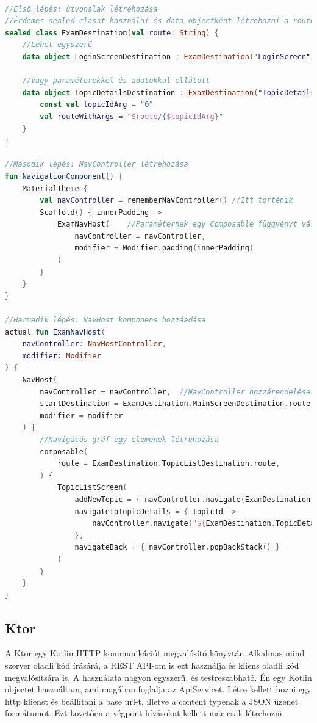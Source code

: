 \begin{lstlisting}[caption={Példa a Navigation használatára.}, label={lst:nav}, language=Kotlin]

//Első lépés: útvonalak létrehozása
//Érdemes sealed classt használni és data objectként létrehozni a routeokat
sealed class ExamDestination(val route: String) {
    //Lehet egyszerű
    data object LoginScreenDestination : ExamDestination("LoginScreen")

    //Vagy paraméterekkel és adatokkal ellátott
    data object TopicDetailsDestination : ExamDestination("TopicDetails") {
        const val topicIdArg = "0"
        val routeWithArgs = "$route/{$topicIdArg}"
    }
}

//Második lépés: NavController létrehozása
fun NavigationComponent() {
    MaterialTheme {
        val navController = rememberNavController() //Itt történik
        Scaffold() { innerPadding ->
            ExamNavHost(    //Paraméternek egy Composable függvényt vár, ezen belül is egy NavHost függvényt
                navController = navController,
                modifier = Modifier.padding(innerPadding)
            )
        }
    }
}

//Harmadik lépés: NavHost komponens hozzáadása
actual fun ExamNavHost(
    navController: NavHostController,
    modifier: Modifier
) {
    NavHost(
        navController = navController,  //NavController hozzárendelése
        startDestination = ExamDestination.MainScreenDestination.route, //Kezdő útvonal beállítása
        modifier = modifier
    ) {
        //Navigácós gráf egy elemének létrehozása
        composable(
            route = ExamDestination.TopicListDestination.route,
        ) {
            TopicListScreen(
                addNewTopic = { navController.navigate(ExamDestination.NewTopicDestination.route) },
                navigateToTopicDetails = { topicId ->
                    navController.navigate("${ExamDestination.TopicDetailsDestination.route}/${topicId}")
                },
                navigateBack = { navController.popBackStack() }
            )
        }
    }
}
\end{lstlisting}

\subsection{Ktor}
\label{sec:Ktor}

A Ktor egy Kotlin HTTP kommunikációt megvalósító könyvtár\cite{Ktor}. Alkalmas mind szerver oladli kód írásárá, a REST API-om is ezt használja és kliens oladli kód megvalósítsára is.
A használata nagyon egyszerű, és testreszabható.
Én egy Kotlin objectet használtam, ami magában foglalja az ApiServicet.
Létre kellett hozni egy http klienst és beállítani a base url-t, illetve a content typenak a JSON üzenet formátumot.
Ezt követően a végpont hívásokat kellett már csak létrehozni.



